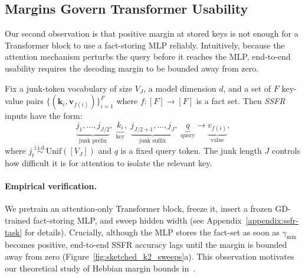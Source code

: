 \subsection{Margins Govern Transformer Usability}
\label{sec:margins-transformer-usability}

Our second observation is that positive margin at stored keys is not enough for a Transformer block to use a fact-storing MLP reliably.
Intuitively, because the attention mechanism perturbs the query before it reaches the MLP, end-to-end usability requires the decoding margin to be bounded away from zero.


\begin{definition}
\label{def:ssfr}
Fix a junk-token vocabulary of size $V_{J}$, a model dimension $d$, and a set of $F$
key-value pairs $\{(\mathbf{k}_{i}, \mathbf{v}_{f(i)})\}_{i=1}^{F}$ where
$f : [F] \to [F]$ is a fact set. Then \emph{SSFR} inputs have the form:
$$
  \underbrace{j_{1}, \ldots, j_{J/2}}_{\text{junk prefix}},\;
  \underbrace{k_i}_{\text{key}},\;
  \underbrace{j_{J/2+1}, \ldots, j_{J}}_{\text{junk suffix}},\;
  \underbrace{q}_{\text{query}} \rightarrow \underbrace{v_{f(i)}}_{\text{value}},
$$
where $j_{t} \overset{\mathrm{i.i.d.}}{\sim} \mathrm{Unif}([V_{J}])$ and $q$ is a fixed query token.
The junk length $J$ controls how difficult it is for attention to isolate the relevant key.
\end{definition}

\paragraph{Empirical verification.}
We pretrain an attention-only Transformer block, freeze it, insert a frozen GD-trained fact-storing MLP, and sweep hidden width (see Appendix~\ref{appendix:ssfr-task} for details).
Crucially, although the MLP stores the fact-set as soon as $\gamma_{\min}$ becomes positive, end-to-end SSFR accuracy lags until the margin is bounded away from zero (Figure~\ref{fig:sketched_k2_sweeps}a).
This observation motivates our theoretical study of Hebbian margin bounds in~.

